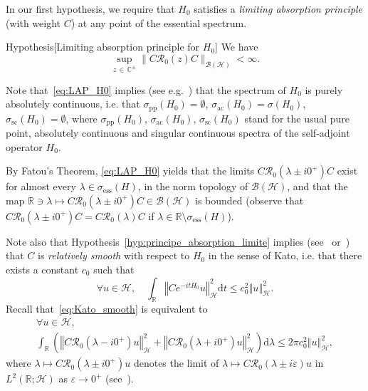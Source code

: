 \documentclass[10pt]{amsart}
\theoremstyle{definition}\newtheorem{defi}[theo]{Definition}\newtheorem{rema}[theo]{Remark}\newtheorem{exam}[theo]{Example}\newtheorem{exem}[theo]{Example}\newtheorem{nota}[theo]{Notation}
\newcommand{\Hi}{\mathcal{H}}
\newcommand{\bbC}{\mathbb{C}}
\newcommand{\R}{\mathbb{R}}
\newcommand{\ess}{\mathrm{ess}}
\newcommand{\acr}{\mathrm{ac}}
\newcommand{\rmd}{\mathrm{d}}
\newcommand{\norme}[1]{\left\Vert #1\right\Vert}
\newcommand{\Res}{\mathcal{R}}
\newcommand{\clB}{\mathcal{B}}
\let\oldforall\forall
\renewcommand*{\forall}{\mathrel{\oldforall}}
\begin{document}
In our first hypothesis, we require that $H_0$ satisfies a \emph{limiting absorption principle} (with weight $C$) at any point of the essential spectrum.


\begin{enonce}{Hypothesis}[Limiting absorption principle for $H_0$]\label{hyp:principe_absorption_limite}
We have
\begin{equation}\label{eq:LAP_H0}
\sup_{z\,\in\,\bbC^\pm}\big\|C\Res_0(z)C\big\|_{\clB(\Hi)}<\infty.
\end{equation}
\end{enonce}


Note that~\eqref{eq:LAP_H0} implies (see e.g.~\cite[Proposition~4.1]{CFKS}) that the spectrum of $H_0$ is purely absolutely continuous, i.e. that $\sigma_{\mathrm{pp}}(H_0)=\emptyset$, $\sigma_{\acr}(H_0)=\sigma(H_0)$, $\sigma_{\mathrm{sc}}(H_0)=\emptyset$, where $\sigma_{\mathrm{pp}}(H_0)$, $\sigma_{\acr}(H_0)$, $\sigma_{\mathrm{sc}}(H_0)$ stand for the usual pure point, absolutely continuous and singular continuous spectra of the self-adjoint operator $H_0$.

By Fatou's Theorem, \eqref{eq:LAP_H0} yields that the limits $C\Res_0(\lambda\pm i0^+)C$ exist for almost every $\lambda\in\sigma_{\ess}(H)$, in the norm topology of $\clB(\Hi)$, and that the map $\R\ni\lambda\mapsto C\Res_0(\lambda\pm i0^+)C\in\clB(\Hi)$ is bounded (observe that $C\Res_0(\lambda\pm i0^+)C=C\Res_0(\lambda)C$ if $\lambda\in\R\setminus\sigma_{\ess}(H)$).

Note also that Hypothesis~\ref{hyp:principe_absorption_limite} implies (see~\cite{Ka65_01} or~\cite[Theorem~XIII.25 and its corollary]{ReSi80_01}) that $C$ is \emph{relatively smooth} with respect to $H_0$ in the sense of Kato, i.e. that there exists a constant $c_0$ such that
\begin{equation}\label{eq:Kato_smooth}
\forall u\in\Hi, \quad \int_\R\norme{Ce^{-itH_0}u}_\Hi^2\rmd t\leq c_0^2\norme{u}_\Hi^2.
\end{equation}
Recall that~\eqref{eq:Kato_smooth} is equivalent to
\begin{multline}\label{eq:Smooth_Ka65_01}
\forall u\in\Hi, \\ \int_\R\left(\norme{C\Res_0\left(\lambda-i0^+\right)u}_\Hi^2+\norme{C\Res_0\left(\lambda+i0^+\right)u}_\Hi^2\right)\rmd \lambda\leq 2\pi c_0^2\norme{u}_\Hi^2,
\end{multline}
where $\lambda\mapsto C\Res_0(\lambda\pm i0^+)u$ denotes the limit of $\lambda\mapsto C\Res_0(\lambda\pm i\varepsilon)u$ in $L^2(\R;\Hi)$ as $\varepsilon\to0^+$ (see~\cite{Ka65_01}).
\end{document}
